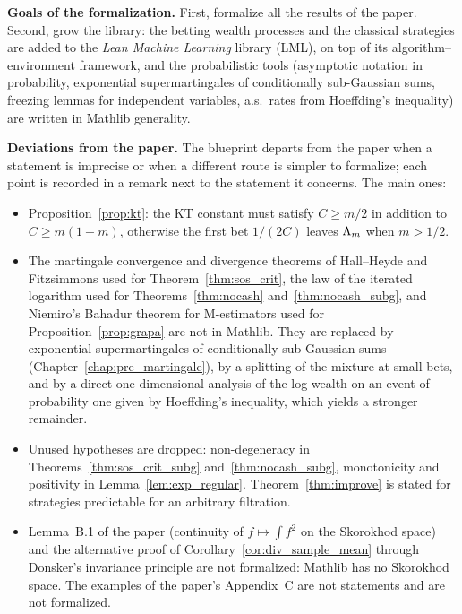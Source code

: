 \textbf{Goals of the formalization.} First, formalize all the results of the paper. Second, grow
the library: the betting wealth processes and the classical strategies are added to the
\emph{Lean Machine Learning} library (LML), on top of its algorithm--environment framework, and
the probabilistic tools (asymptotic notation in probability, exponential supermartingales of
conditionally sub-Gaussian sums, freezing lemmas for independent variables, a.s.\ rates from
Hoeffding's inequality) are written in Mathlib generality.

\textbf{Deviations from the paper.} The blueprint departs from the paper when a statement is
imprecise or when a different route is simpler to formalize; each point is recorded in a remark
next to the statement it concerns. The main ones:
\begin{itemize}
  \item Proposition~\ref{prop:kt}: the KT constant must satisfy $C \ge m/2$ in addition to
        $C \ge m(1-m)$, otherwise the first bet $1/(2C)$ leaves $\Lambda_m$ when $m > 1/2$.
  \item The martingale convergence and divergence theorems of Hall--Heyde and Fitzsimmons used
        for Theorem~\ref{thm:sos_crit}, the law of the iterated logarithm used for
        Theorems~\ref{thm:nocash} and~\ref{thm:nocash_subg}, and Niemiro's Bahadur theorem for
        M-estimators used for Proposition~\ref{prop:grapa} are not in Mathlib. They are replaced by
        exponential supermartingales of conditionally sub-Gaussian sums
        (Chapter~\ref{chap:pre_martingale}), by a splitting of the mixture at small bets, and by a
        direct one-dimensional analysis of the log-wealth on an event of probability one given by
        Hoeffding's inequality, which yields a stronger remainder.
  \item Unused hypotheses are dropped: non-degeneracy in Theorems~\ref{thm:sos_crit_subg}
        and~\ref{thm:nocash_subg}, monotonicity and positivity in Lemma~\ref{lem:exp_regular}.
        Theorem~\ref{thm:improve} is stated for strategies predictable for an arbitrary
        filtration.
  \item Lemma~B.1 of the paper (continuity of $f \mapsto \int f^2$ on the Skorokhod space) and the
        alternative proof of Corollary~\ref{cor:div_sample_mean} through Donsker's invariance
        principle are not formalized: Mathlib has no Skorokhod space. The examples of the paper's
        Appendix~C are not statements and are not formalized.
\end{itemize}

